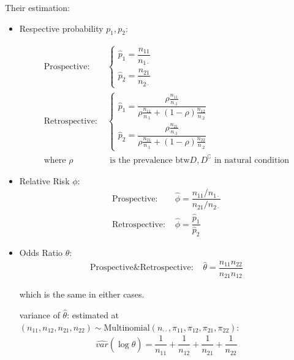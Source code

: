     Their estimation:
\begin{itemize}[topsep=2pt,itemsep=0pt]
    \item Respective probability $ p_1,p_2 $:
    
    \begin{align}
        \text{Prospective: }  &\begin{cases}
            \hat{p}_1=\dfrac{n_{11}}{n_{1\cdot }}\\
            \hat{p}_2=\dfrac{n_{21}}{n_{2\cdot }}
        \end{cases}  \\
        \text{Retrospective: }&\begin{cases}
            \hat{p}_1=\dfrac{\rho \frac{n_{11}}{n_{\cdot 1}}}{\rho \frac{n_{11}}{n_{\cdot 1}}+(1-\rho )\frac{n_{12}}{n_{\cdot 2}}}\\
            \hat{p}_2=\dfrac{\rho \frac{n_{21}}{n_{\cdot 1}}}{\rho \frac{n_{21}}{n_{\cdot 1}}+(1-\rho )\frac{n_{22}}{n_{\cdot 2}}}
        \end{cases}\\
        \text{where }\rho &\text{ is the prevalence btw} D,D^\complement \text{ in natural condition}
    \end{align}
    
    \item Relative Risk $ \phi  $:
    \begin{align}
        \text{Prospective: }  &\hat{\phi }= \dfrac{n_{11}\big/n_{1\cdot }}{n_{21}\big/n_{2\cdot }} \\
        \text{Retrospective: }&\hat{\phi }=\dfrac{\hat{p}_1}{\hat{p}_2}
    \end{align}

    \item Odds Ratio $ \theta  $:
    \begin{align}
        \text{Prospective} \& \text{Retrospective: }& \hat{\theta }=\dfrac{n_{11}n_{22}}{n_{21}n_{12}}
    \end{align}
    
    which is the same in either cases.

    variance of $ \hat{\theta }  $: estimated at $ (n_{11},n_{12},n_{21},n_{22})\sim\mathrm{Multinomial}(n_{\cdot \cdot },\pi_{11},\pi_{12},\pi_{21},\pi_{22}) $:
    \begin{align}
        \hat{var}(\log \hat{\theta })=\dfrac{1}{n_{11}}+\dfrac{1}{n_{12}}+\dfrac{1}{n_{21}}+\dfrac{1}{n_{22}} 
    \end{align}

    
        
\end{itemize}

